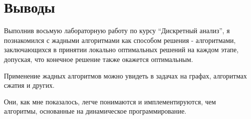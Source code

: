  
\section{Выводы}
Выполнив восьмую лабораторную работу по курсу \enquote{Дискретный анализ}, я познакомился с жадными алгоритмами как способом решения - алгоритмами, заключающихся в принятии локально оптимальных решений на каждом этапе, допуская, что конечное решение также окажется оптимальным.

Применение жадных алгоритмов можно увидеть в задачах на графах, алгоритмах сжатия и других.

Они, как мне показалось, легче понимаются и имплементируются, чем алгоритмы, основанные на динамическое программирование.
\pagebreak